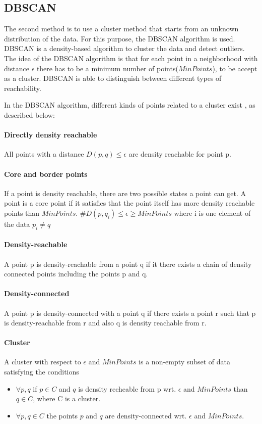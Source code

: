 \subsection{DBSCAN}\label{DBSCAN}

The second method is to use a cluster method that starts from an unknown distribution of the data.
For this purpose, the DBSCAN algorithm is used. DBSCAN is a density-based algorithm to cluster the data and detect outliers. The idea of the DBSCAN algorithm is that for each point in a neighborhood with distance $\epsilon$ there has to be a minimum number of points($MinPoints$), to be accept as a cluster.
DBSCAN is able to distinguish between different types of reachability.

In the DBSCAN algorithm, different kinds of points related to a cluster exist \cite{ester:1996}, as described below:


\paragraph{Directly density reachable}
All points with a distance $D(p,q) \le \epsilon$ are density reachable for point p.

\paragraph{Core and border points}
If a point is density reachable, there are two possible states a point can get. A point is a core point if it satisfies that the point itself has more density reachable points than $MinPoints$.
$\# D(p,q_{i}) \le \epsilon \ge MinPoints$ where i is one element of the data $ p_{i} \neq q$

\paragraph{Density-reachable}
A point p is density-reachable from a point q if it there exists a chain of density connected points including the points p and q.

\paragraph{Density-connected}
A point p is density-connected with a point q if there exists a point r such that p is density-reachable from r and also q is density reachable from r.

\paragraph{Cluster}
A cluster with respect to $\epsilon$ and $MinPoints$ is a non-empty subset of data satisfying the conditions
\begin{itemize}
    \item $\forall p,q $ if $p \in C$ and $q$ is density recheable from p wrt. $\epsilon$ and $MinPoints$ than $q \in C$, where C is a cluster.
    \item $\forall p,q \in C$ the points $p$ and $q$ are density-connected wrt. $\epsilon$ and $MinPoints$. 
\end{itemize}

